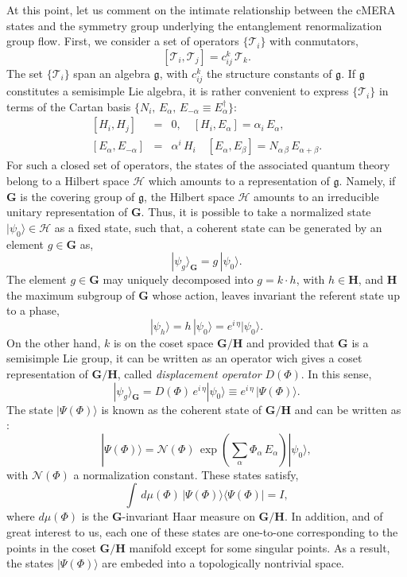 \documentclass[preprint,aps]{revtex4}
\def\barray{\begin{eqnarray}}
\def\earray{\end{eqnarray}}
\def\beq{\begin{equation}}
\def\eeq{\end{equation}}
\begin{document}
At this point, let us comment on the intimate relationship between the cMERA states and the symmetry group underlying the entanglement renormalization group flow. First, we consider a set of operators $\lbrace \mathcal{T}_i\rbrace$ with conmutators,
\beq
\label{eq2.17}
\left[ \mathcal{T}_i,  \mathcal{T}_j\right]=c_{ij}^k\, \mathcal{T}_k.
\eeq
The set $\lbrace \mathcal{T}_i\rbrace$ span an algebra $\mathfrak{g}$, with $c_{ij}^k$ the structure constants of $\mathfrak{g}$. If $\mathfrak{g}$ constitutes a semisimple Lie algebra, it is rather convenient to express $\lbrace \mathcal{T}_i\rbrace$ in terms of the Cartan basis $\lbrace N_i, \, E_{\alpha},\, E_{-\alpha}\equiv E_{\alpha}^{\dagger}\rbrace$:
\barray
\label{eq2.18}
\left[ H_i,  H_j\right]&=&0, \quad \left[ H_i,  E_{\alpha}\right]=\alpha_i\, E_{\alpha}, \\ \nonumber
\left[ E_{\alpha},  E_{-\alpha}\right]&=&\alpha^{i}\, H_{i} \quad \left[ E_{\alpha},  E_{\beta}\right]=N_{\alpha\, \beta}\,  E_{\alpha + \beta}.
\earray
For such a closed set of operators, the states of the associated quantum theory belong to a Hilbert space $\mathcal{H}$ which amounts to a representation of $\mathfrak{g}$. Namely, if $\mathbf{G}$ is the covering group of $\mathfrak{g}$, the Hilbert space $\mathcal{H}$ amounts to an irreducible unitary representation of $\mathbf{G}$. Thus, it is possible to take a normalized state $|\psi_0\rangle \in \mathcal{H}$ as a fixed state, such that, a coherent state can be generated by an element $g \in \mathbf{G}$ as,
\beq
\label{eq2.19}
|\psi_g\rangle_{\mathbf{G}}=g\, |\psi_0\rangle.
\eeq
The element $g \in \mathbf{G}$ may uniquely decomposed into $g=k \cdot h$, with $h \in \mathbf{H}$, and $\mathbf{H}$ the maximum subgroup of $\mathbf{G}$ whose action, leaves invariant the referent state up to a phase,
\beq
\label{eq2.20}
|\psi_h\rangle=h\, |\psi_0\rangle = e^{i\, \eta} |\psi_0\rangle.
\eeq
On the other hand, $k$ is on the coset space $\mathbf{G}/\mathbf{H}$ and provided that $\mathbf{G}$ is a semisimple Lie group, it can be written as an operator wich gives a coset representation of $\mathbf{G}/\mathbf{H}$, called \textit{displacement operator} $D(\Phi)$. In this sense,
\beq
\label{eq2.21}
|\psi_g\rangle_{\mathbf{G}}=D(\Phi)\, e^{i\, \eta} |\psi_0\rangle \equiv e^{i\, \eta}\, |\Psi(\Phi)\rangle.
\eeq
The state $|\Psi(\Phi)\rangle$ is known as the coherent state of $\mathbf{G}/\mathbf{H}$ and can be written as \cite{perelmonov}:
\beq
\label{eq2.22}
|\Psi(\Phi)\rangle=\mathcal{N}(\Phi)\, \exp \left( \sum_{\alpha} \Phi_{\alpha}\, E_{\alpha} \right) |\psi_0\rangle,
\eeq
with $\mathcal{N}(\Phi)$ a normalization constant. These states satisfy,
\beq
\label{eq2.23}
\int\, d\mu(\Phi)\, |\Psi(\Phi)\rangle \langle \Psi(\Phi)| = I,
\eeq
where $d\mu(\Phi)$ is the $\mathbf{G}$-invariant Haar measure on $\mathbf{G}/\mathbf{H}$. In addition, and of great interest to us, each one of these states are one-to-one corresponding to the points in the coset $\mathbf{G}/\mathbf{H}$ manifold except for some singular points. As a result, the states $|\Psi(\Phi)\rangle$ are embeded into a topologically nontrivial space.
\end{document}
